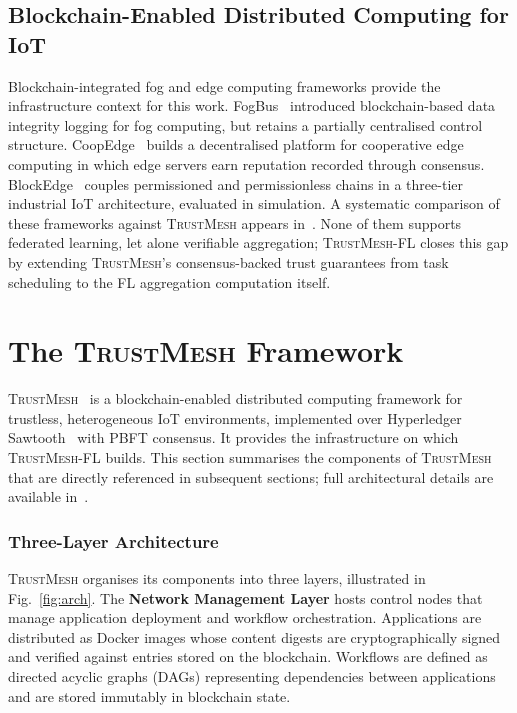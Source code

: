 \documentclass[lettersize,journal]{IEEEtran}
\newcommand{\tmfl}{\textsc{TrustMesh-FL}}
\newcommand{\tm}{\textsc{TrustMesh}}
\begin{document}
\subsection{Blockchain-Enabled Distributed Computing for IoT}

Blockchain-integrated fog and edge computing frameworks provide the infrastructure
context for this work. FogBus~\cite{tuli2019fogbus} introduced blockchain-based data
integrity logging for fog computing, but retains a partially centralised control
structure. CoopEdge~\cite{yuan2021coopedge} builds a decentralised platform for
cooperative edge computing in which edge servers earn reputation recorded through
consensus. BlockEdge~\cite{kumar2020blockedge} couples permissioned and permissionless
chains in a three-tier industrial IoT architecture, evaluated in simulation. A
systematic comparison of these frameworks against \tm{} appears
in~\cite{rangwala2025trustmesh}. None of them supports federated learning, let alone
verifiable aggregation; \tmfl{} closes this gap by extending \tm{}'s consensus-backed
trust guarantees from task scheduling to the FL aggregation computation itself.

\section{The \tm{} Framework}
\label{sec:preliminaries}

\tm{}~\cite{rangwala2025trustmesh} is a blockchain-enabled distributed computing framework
for trustless, heterogeneous IoT environments, implemented over Hyperledger
Sawtooth~\cite{hyperledger2018sawtooth} with PBFT consensus. It provides the
infrastructure on which \tmfl{} builds. This section summarises the components
of \tm{} that are directly referenced in subsequent sections; full architectural details
are available in~\cite{rangwala2025trustmesh}.

\subsubsection*{Three-Layer Architecture}

\tm{} organises its components into three layers, illustrated in Fig.~\ref{fig:arch}.
The \textbf{Network Management Layer} hosts control nodes that manage application
deployment and workflow orchestration. Applications are distributed as Docker images
whose content digests are cryptographically signed and verified against entries stored
on the blockchain. Workflows are defined as directed acyclic graphs (DAGs) representing
dependencies between applications and are stored immutably in blockchain state.
\end{document}
